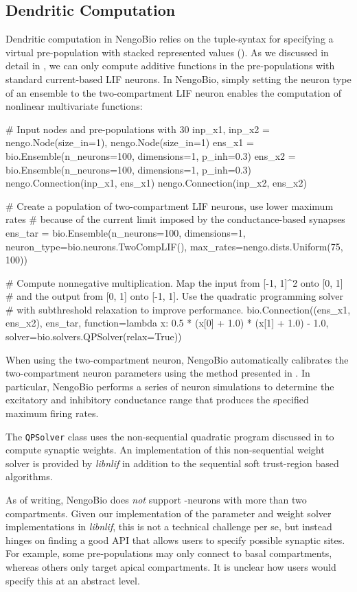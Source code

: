 \subsection{Dendritic Computation}
Dendritic computation in NengoBio relies on the tuple-syntax for specifying a virtual pre-population with stacked represented values ().
As we discussed in detail in , we can only compute additive functions in the pre-populations with standard current-based LIF neurons.
In NengoBio, simply setting the neuron type of an ensemble to the two-compartment LIF neuron enables the computation of nonlinear multivariate functions:
\begin{pythoncode}
# Input nodes and pre-populations with 30%
inp_x1, inp_x2 = nengo.Node(size_in=1), nengo.Node(size_in=1)
ens_x1 = bio.Ensemble(n_neurons=100, dimensions=1, p_inh=0.3)
ens_x2 = bio.Ensemble(n_neurons=100, dimensions=1, p_inh=0.3)
nengo.Connection(inp_x1, ens_x1)
nengo.Connection(inp_x2, ens_x2)

# Create a population of two-compartment LIF neurons, use lower maximum rates
# because of the current limit imposed by the conductance-based synapses
ens_tar = bio.Ensemble(n_neurons=100, dimensions=1,
                       neuron_type=bio.neurons.TwoCompLIF(),
                       max_rates=nengo.dists.Uniform(75, 100))

# Compute nonnegative multiplication. Map the input from [-1, 1]^2 onto [0, 1]
# and the output from [0, 1] onto [-1, 1]. Use the quadratic programming solver
# with subthreshold relaxation to improve performance.
bio.Connection((ens_x1, ens_x2), ens_tar,
               function=lambda x: 0.5 * (x[0] + 1.0) * (x[1] + 1.0) - 1.0,
               solver=bio.solvers.QPSolver(relax=True))
\end{pythoncode}
When using the two-compartment \LIF neuron, NengoBio automatically calibrates the two-compartment neuron parameters using the method presented in .
In particular, NengoBio performs a series of neuron simulations to determine the excitatory and inhibitory conductance range that produces the specified maximum firing rates.

The \texttt{QPSolver} class uses the non-sequential quadratic program discussed in  to compute synaptic weights.
An implementation of this non-sequential weight solver is provided by \emph{libnlif} in addition to the sequential soft trust-region based algorithms.

As of writing, NengoBio does \emph{not} support \nlif-neurons with more than two compartments.
Given our implementation of the parameter and weight solver implementations in \emph{libnlif}, this is not a technical challenge per se, but instead hinges on finding a good API that allows users to specify possible synaptic sites.
For example, some pre-populations may only connect to basal compartments, whereas others only target apical compartments.
It is unclear how users would specify this at an abstract level.
